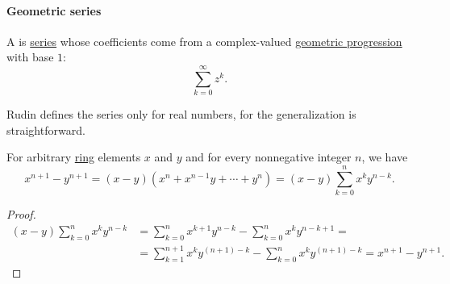 \paragraph{Geometric series}

\begin{definition}\label{def:geometric_series}
  A  is \hyperref[def:convergent_series]{series} whose coefficients come from a complex-valued \hyperref[def:geometric_progression]{geometric progression} with base \( 1 \):
  \begin{equation}\label{eq:def:geometric_series}
    \sum_{k=0}^\infty z^k.
  \end{equation}
\end{definition}
\begin{comments}
  \item Rudin defines the series only for real numbers, for the generalization is straightforward.
\end{comments}

\begin{proposition}\label{thm:xn_minus_yn_factorization}
  For arbitrary \hyperref[def:ring]{ring} elements \( x \) and \( y \) and for every nonnegative integer \( n \), we have
  \begin{equation}\label{eq:thm:xn_minus_yn_factorization}
    x^{n + 1} - y^{n + 1} = (x - y)(x^n + x^{n-1} y + \cdots + y^n) = (x - y) \sum_{k=0}^n x^k y^{n-k}.
  \end{equation}
\end{proposition}
\begin{proof}
  \begin{align*}
    (x - y) \sum_{k=0}^n x^k y^{n-k}
    &=
    \sum_{k=0}^n x^{k+1} y^{n-k} - \sum_{k=0}^n x^k y^{n-k+1}
    = \\ &=
    \sum_{k=1}^{n+1} x^k y^{(n+1)-k} - \sum_{k=0}^n x^k y^{(n+1)-k}
    =
    x^{n+1} - y^{n+1}.
  \end{align*}
\end{proof}


